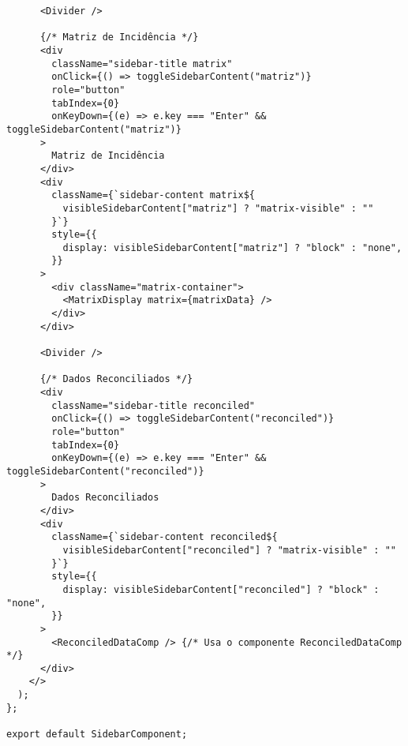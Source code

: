 \begin{verbatim}
      <Divider />

      {/* Matriz de Incidência */}
      <div
        className="sidebar-title matrix"
        onClick={() => toggleSidebarContent("matriz")}
        role="button"
        tabIndex={0}
        onKeyDown={(e) => e.key === "Enter" && toggleSidebarContent("matriz")}
      >
        Matriz de Incidência
      </div>
      <div
        className={`sidebar-content matrix${
          visibleSidebarContent["matriz"] ? "matrix-visible" : ""
        }`}
        style={{
          display: visibleSidebarContent["matriz"] ? "block" : "none",
        }}
      >
        <div className="matrix-container">
          <MatrixDisplay matrix={matrixData} />
        </div>
      </div>

      <Divider />

      {/* Dados Reconciliados */}
      <div
        className="sidebar-title reconciled"
        onClick={() => toggleSidebarContent("reconciled")}
        role="button"
        tabIndex={0}
        onKeyDown={(e) => e.key === "Enter" && toggleSidebarContent("reconciled")}
      >
        Dados Reconciliados
      </div>
      <div
        className={`sidebar-content reconciled${
          visibleSidebarContent["reconciled"] ? "matrix-visible" : ""
        }`}
        style={{
          display: visibleSidebarContent["reconciled"] ? "block" : "none",
        }}
      >
        <ReconciledDataComp /> {/* Usa o componente ReconciledDataComp */}
      </div>
    </>
  );
};

export default SidebarComponent;
\end{verbatim}

